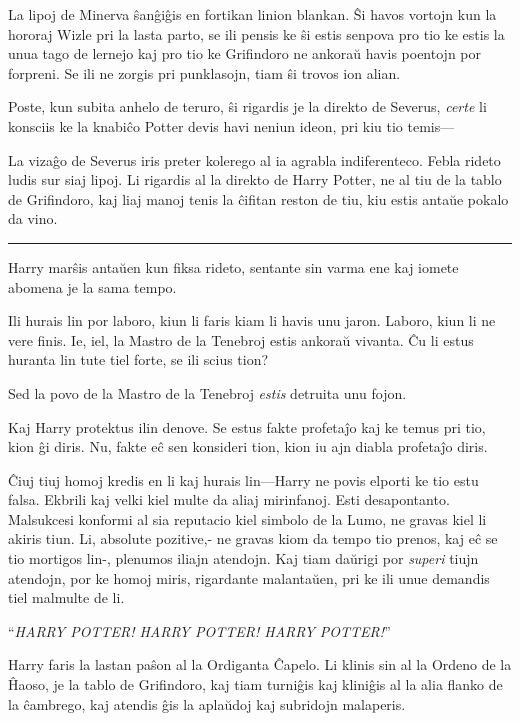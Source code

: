 La lipoj de Minerva ŝanĝiĝis en fortikan linion blankan. Ŝi havos
vortojn kun la hororaj Wizle pri la lasta parto, se ili pensis ke ŝi
estis senpova pro tio ke estis la unua tago de lernejo kaj pro tio ke
Grifindoro ne ankoraŭ havis poentojn por forpreni. Se ili ne zorgis
pri punklasojn, tiam ŝi trovos ion alian.

Poste, kun subita anhelo de teruro, ŝi rigardis je la direkto de
Severus, \emph{certe} li konsciis ke la knabiĉo Potter devis havi
neniun ideon, pri kiu tio temis—

La vizaĝo de Severus iris preter kolerego al ia agrabla
indiferenteco. Febla rideto ludis sur siaj lipoj. Li rigardis al la
direkto de Harry Potter, ne al tiu de la tablo de Grifindoro, kaj liaj
manoj tenis la ĉifitan reston de tiu, kiu estis antaŭe pokalo da vino.

\begin{center}\rule{3in}{0.4pt}\end{center}

Harry marŝis antaŭen kun fiksa rideto, sentante sin varma ene kaj
iomete abomena je la sama tempo.

Ili hurais lin por laboro, kiun li faris kiam li havis unu
jaron. Laboro, kiun li ne vere finis. Ie, iel, la Mastro de la
Tenebroj estis ankoraŭ vivanta. Ĉu li estus huranta lin tute tiel
forte, se ili scius tion?

Sed la povo de la Mastro de la Tenebroj \emph{estis} detruita unu
fojon.

Kaj Harry protektus ilin denove. Se estus fakte profetaĵo kaj ke temus
pri tio, kion ĝi diris. Nu, fakte eĉ sen konsideri tion, kion iu ajn
diabla profetaĵo diris.

Ĉiuj tiuj homoj kredis en li kaj hurais lin—Harry ne povis elporti ke
tio estu falsa. Ekbrili kaj velki kiel multe da aliaj mirinfanoj. Esti
desapontanto. Malsukcesi konformi al sia reputacio kiel simbolo de la
Lumo, ne gravas kiel li akiris tiun. Li, absolute pozitive,- ne gravas
kiom da tempo tio prenos, kaj eĉ se tio mortigos lin-, plenumos iliajn
atendojn. Kaj tiam daŭrigi por \emph{superi} tiujn atendojn, por ke
homoj miris, rigardante malantaŭen, pri ke ili unue demandis
tiel malmulte de li.

``\emph{HARRY POTTER! HARRY POTTER! HARRY POTTER!}''

Harry faris la lastan paŝon al la Ordiganta Ĉapelo. Li klinis sin al
la Ordeno de la Ĥaoso, je la tablo de Grifindoro, kaj tiam turniĝis
kaj kliniĝis al la alia flanko de la ĉambrego, kaj atendis ĝis la
aplaŭdoj kaj subridojn malaperis.

